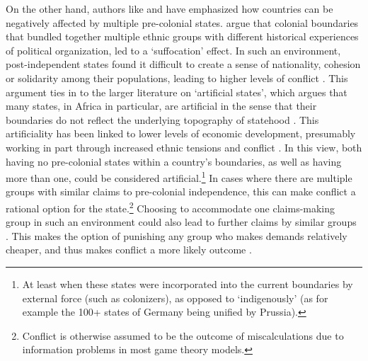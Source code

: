 On the other hand, authors like \citet{Englebert2002} and \citet{Alesina2011}
have emphasized how countries can be negatively affected by multiple
pre-colonial states. \citet{Englebert2002} argue that colonial boundaries that
bundled together multiple ethnic groups with different historical experiences of
political organization, led to a `suffocation' effect. In such an environment,
post-independent states found it difficult to create a sense of nationality,
cohesion or solidarity among their populations, leading to higher levels of
conflict \citep{Englebert2002}. This argument ties in to the larger literature
on `artificial states', which argues that many states, in Africa in particular,
are artificial in the sense that their boundaries do not reflect the underlying
topography of statehood \citep{Alesina2011, Clapham1996, Jackson1991}. This
artificiality has been linked to lower levels of economic development,
presumably working in part through increased ethnic tensions and conflict
\citep{Alesina2011}. In this view, both having no pre-colonial states within a
country's boundaries, as well as having more than one, could be considered
artificial.\footnote{At least when these states were incorporated into the
current boundaries by external force (such as colonizers), as opposed to
`indigenously' (as for example the 100+ states of Germany being unified by
Prussia).} In cases where there are multiple groups with similar claims to
pre-colonial independence, this can make conflict a rational option for the
state.\footnote{Conflict is otherwise assumed to be the outcome of
miscalculations due to information problems in most game theory models.}
Choosing to accommodate one claims-making group in such an environment could
also lead to further claims by similar groups \citep{Walter2009}. This makes the
option of punishing any group who makes demands relatively cheaper, and thus
makes conflict a more likely outcome \citep{Wishman}.

